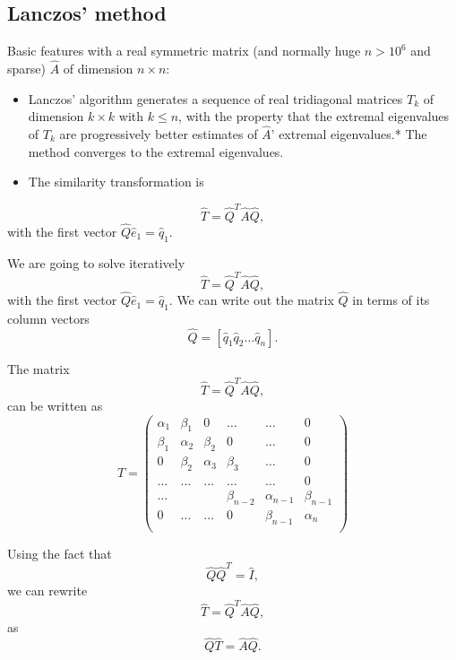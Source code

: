 \documentclass[%
oneside,                 %
final,                   %
10pt]{article}
\begin{document}
\subsection*{Lanczos' method}

Basic features with a real symmetric matrix (and normally huge $n> 10^6$ and sparse) 
$\hat{A}$ of dimension $n\times n$:

\begin{itemize}
\item Lanczos' algorithm generates a sequence of real tridiagonal matrices $T_k$ of dimension $k\times k$ with $k\le n$, with the property that the extremal eigenvalues of $T_k$ are progressively better estimates of $\hat{A}$' extremal eigenvalues.* The method converges to the extremal eigenvalues.

\item The similarity transformation is 
\end{itemize}

\noindent
\[
\hat{T}= \hat{Q}^{T}\hat{A}\hat{Q},
\]
with the first vector $\hat{Q}\hat{e}_1=\hat{q}_1$.

We are going to solve iteratively
\[
\hat{T}= \hat{Q}^{T}\hat{A}\hat{Q},
\]
with the first vector $\hat{Q}\hat{e}_1=\hat{q}_1$.
We can write out the matrix $\hat{Q}$ in terms of its column vectors 
\[
\hat{Q}=\left[\hat{q}_1\hat{q}_2\dots\hat{q}_n\right].
\]

The matrix
\[
\hat{T}= \hat{Q}^{T}\hat{A}\hat{Q},
\]
can be written as 
\[
    \hat{T} = \left(\begin{array}{cccccc}
                           \alpha_1& \beta_1 & 0 &\dots   & \dots &0 \\
                           \beta_1 & \alpha_2 & \beta_2 &0 &\dots &0 \\
                           0& \beta_2 & \alpha_3 & \beta_3 & \dots &0 \\
                           \dots& \dots   & \dots &\dots   &\dots & 0 \\
                           \dots&   &  &\beta_{n-2}  &\alpha_{n-1}& \beta_{n-1} \\
                           0&  \dots  &\dots  &0   &\beta_{n-1} & \alpha_{n} \\
                      \end{array} \right)
\]

Using the fact that 
\[
\hat{Q}\hat{Q}^T=\hat{I}, 
\]
we can rewrite 
\[
\hat{T}= \hat{Q}^{T}\hat{A}\hat{Q},
\]
as 
\[
\hat{Q}\hat{T}= \hat{A}\hat{Q}.
\]
\end{document}
